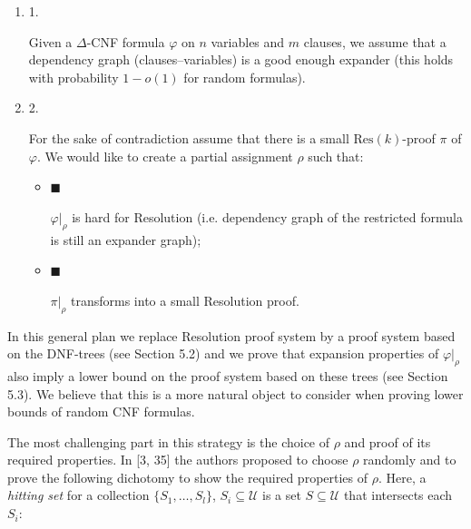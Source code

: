 \documentclass[10pt,a4paper]{article}
\begin{document}
\begin{enumerate}


\item[] 
1. 


Given a $\Delta$-CNF formula $\varphi$ on $n$ variables and $m$ clauses, we assume that
a dependency graph (clauses–variables) is a good enough expander (this holds with probability $1-o(1)$ for random formulas).\par





\item[] 
2. 


For the sake of contradiction assume that there is a small $\mathrm{Res}(k)$-proof $\pi$ of $\varphi$. We
would like to create a partial assignment $\rho$ such that:\par


\begin{itemize}


\item[] 
$\blacksquare$ 


$\varphi|_{\rho}$ is hard for Resolution (i.e. dependency graph of the restricted
formula is still an expander graph);\par





\item[] 
$\blacksquare$ 


$\pi|_{\rho}$ transforms into a small Resolution proof.\par





\end{itemize}





\end{enumerate}




In this general plan we replace Resolution proof system by a proof system based on the DNF-trees (see
Section 5.2) and we prove that expansion properties of $\varphi|_{\rho}$ also imply a
lower bound on the proof system based on these trees (see Section 5.3). We believe that
this is a more natural object to consider when proving lower bounds of random CNF formulas.\par




The most challenging part in this strategy is the choice of $\rho$ and proof of its required properties.
In [3, 35] the authors proposed to choose $\rho$ randomly and to
prove the following dichotomy to show the required properties of $\rho$. Here, a \emph{hitting set}
for a collection $\{S_{1},\ldots,S_{l}\}$, $S_{i}\subseteq\mathcal{U}$ is a set $S\subseteq\mathcal{U}$
that intersects each $S_{i}$:\par
\end{document}
